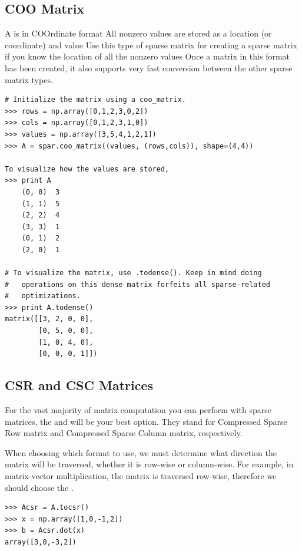 \subsection*{COO Matrix} %

A  is in COOrdinate format
All nonzero values are stored as a
location (or coordinate) and value
Use this type of sparse matrix for creating
a sparse matrix if you know the location of all the nonzero values
Once a matrix
in this format has been created, it also supports very fast conversion between
the other sparse matrix types.

\begin{lstlisting}
# Initialize the matrix using a coo_matrix.
>>> rows = np.array([0,1,2,3,0,2])
>>> cols = np.array([0,1,2,3,1,0])
>>> values = np.array([3,5,4,1,2,1])
>>> A = spar.coo_matrix((values, (rows,cols)), shape=(4,4))

To visualize how the values are stored,
>>> print A
    (0, 0)  3
    (1, 1)  5
    (2, 2)  4
    (3, 3)  1
    (0, 1)  2
    (2, 0)  1

# To visualize the matrix, use .todense(). Keep in mind doing
#   operations on this dense matrix forfeits all sparse-related
#   optimizations.
>>> print A.todense()
matrix([[3, 2, 0, 0],
        [0, 5, 0, 0],
        [1, 0, 4, 0],
        [0, 0, 0, 1]])
\end{lstlisting}

\subsection*{CSR and CSC Matrices} %

For the vast majority of matrix computation you can perform with sparse matrices, the  and  will be your best option.
They stand for
Compressed Sparse Row matrix and Compressed Sparse Column matrix, respectively.

When choosing which format to use, we must determine what direction the matrix
will be traversed, whether it is row-wise or column-wise.
For example, in matrix-vector multiplication, the matrix is traversed row-wise, therefore we should choose the .

\begin{lstlisting}
>>> Acsr = A.tocsr()
>>> x = np.array([1,0,-1,2])
>>> b = Acsr.dot(x)
array([3,0,-3,2])
\end{lstlisting}

